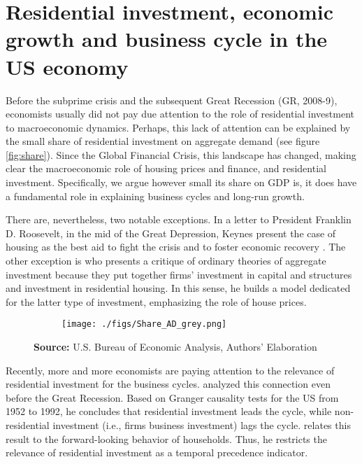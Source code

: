 \documentclass[12pt, a4paper]{article}
\begin{document}
\section{Residential investment, economic growth and business cycle in the US economy}
\label{sec:org36f3f5d}
\label{sec:Stylized_Facts}
Before the subprime crisis and the subsequent Great Recession (GR, 2008-9), economists usually did not pay due attention to the role of residential investment to macroeconomic dynamics.
Perhaps, this lack of attention can be explained by the small share of residential investment on aggregate demand (see figure \ref{fig:share}).
Since the Global Financial Crisis, this landscape has changed, making clear the macroeconomic role of housing prices and finance, and residential investment.
Specifically, we argue however small its share on GDP is, it does have a fundamental role in explaining business cycles and long-run growth.

There are, nevertheless, two notable exceptions. In a letter to President Franklin D. Roosevelt, in the mid of the Great Depression, Keynes present the case of housing as the best aid to fight the crisis and to foster economic recovery \cite[p.~436]{keynes_collected_1978}.
The other exception is \textcite{duesenberry_investment_1958} who presents a critique of ordinary theories of aggregate investment because they put together firms’ investment in capital and structures and investment in residential housing.
In this sense, he builds a model dedicated for the latter type of investment, emphasizing the role of house prices.


\begin{figure}[H]
    \centering
	\caption{Expenditures share on GDP}
	\label{fig:share}
\begin{figure}[htb]
    \texttt{[image: ./figs/Share\_AD\_grey.png]}
    \end{figure}
	\caption*{\textbf{Source:} U.S. Bureau of Economic Analysis, Authors' Elaboration}
\end{figure}

Recently, more and more economists are paying attention to the relevance of residential investment for the business cycles.
\textcite{green_follow_1997} analyzed this connection even before the Great Recession.
Based on Granger causality tests for the US from 1952 to 1992, he concludes that residential investment leads the cycle, while non-residential investment (i.e., firms business investment) lags the cycle.
\textcite{green_follow_1997} relates this result to the forward-looking behavior of households.
Thus, he restricts the relevance of residential investment as a temporal precedence indicator.
\end{document}
